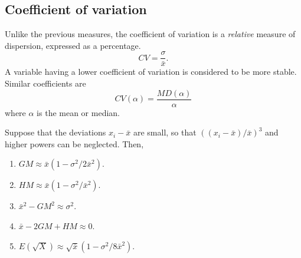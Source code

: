 \documentclass[11pt]{article}
\theoremstyle{definition}
\theoremstyle{remark}
\numberwithin{equation}{section}
\begin{document}
    \subsection{Coefficient of variation}

    Unlike the previous measures, the coefficient of variation is a \emph{relative}
    measure of dispersion, expressed as a percentage. \[
        CV = \frac{\sigma}{\bar{x}}.
    \] A variable having a lower coefficient of variation is considered to be more
    stable. Similar coefficients are \[
        CV(\alpha) = \frac{MD(\alpha)}{\alpha}
    \] where $\alpha$ is the mean or median.


    \begin{exercise}
        Suppose that the deviations $x_i - \bar{x}$ are small, so that $((x_i -
        \bar{x}) / \bar{x})^3$ and higher powers can be neglected. Then, \begin{enumerate}
            \item $GM \approx \bar{x}(1 - \sigma^2 / 2\bar{x}^2)$.
            \item $HM \approx \bar{x}(1 - \sigma^2 / \bar{x}^2)$.
            \item $\bar{x}^2 - GM^2 \approx \sigma^2$.
            \item $\bar{x} - 2GM + HM \approx 0$.
            \item $E(\sqrt{X}) \approx \sqrt{\bar{x}}(1 - \sigma^2 / 8\bar{x}^2)$.
        \end{enumerate}
    \end{exercise}
\end{document}
